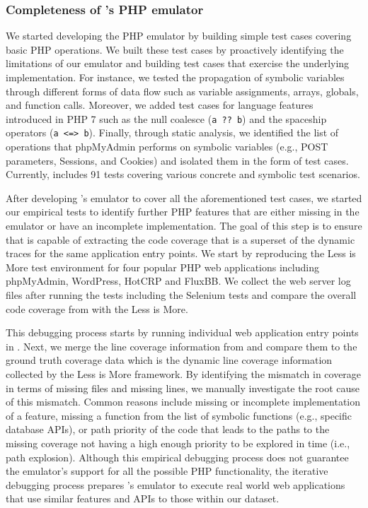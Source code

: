 \subsubsection{Completeness of \animatedead{}'s PHP emulator}
\label{sec:debugging}
We started developing the PHP emulator by building simple test cases covering basic PHP operations. 
We built these test cases by proactively identifying the limitations of our emulator and building test cases that exercise the underlying implementation. 
For instance, we tested the propagation of symbolic variables through different forms of data flow such as variable assignments, arrays, globals, and function calls. 
Moreover, we added test cases for language features introduced in PHP 7 such as the null coalesce (\texttt{a ?? b}) and the spaceship operators (\texttt{a <=> b}). 
Finally, through static analysis, we identified the list of operations that phpMyAdmin performs on symbolic variables (e.g., POST parameters, Sessions, and Cookies) and isolated them in the form of test cases. 
Currently, \animatedead{} includes 91 tests covering various concrete and symbolic test scenarios. 

After developing \animatedead{}'s emulator to cover all the aforementioned test cases, we started our empirical tests to identify further PHP features that are either missing in the emulator or have an incomplete implementation. 
The goal of this step is to ensure that \animatedead{} is capable of extracting the code coverage that is a superset of the dynamic traces for the same application entry points. 
We start by reproducing the Less is More test environment for four popular PHP web applications including phpMyAdmin, WordPress, HotCRP and FluxBB. 
We collect the web server log files after running the tests including the Selenium tests and compare the overall code coverage from \animatedead{} with the Less is More. 

This debugging process starts by running individual web application entry points in \animatedead{}. 
Next, we merge the line coverage information from \animatedead{} and compare them to the ground truth coverage data which is the dynamic line coverage information collected by the Less is More framework. 
By identifying the mismatch in coverage in terms of missing files and missing lines, we manually investigate the root cause of this mismatch. 
Common reasons include missing or incomplete implementation of a feature, missing a function from the list of symbolic functions (e.g., specific database APIs), or path priority of the code that leads to the paths to the missing coverage not having a high enough priority to be explored in time (i.e., path explosion). 
Although this empirical debugging process does not guarantee the emulator's support for all the possible PHP functionality, the iterative debugging process prepares \animatedead{}'s emulator to execute real world web applications that use similar features and APIs to those within our dataset. 

